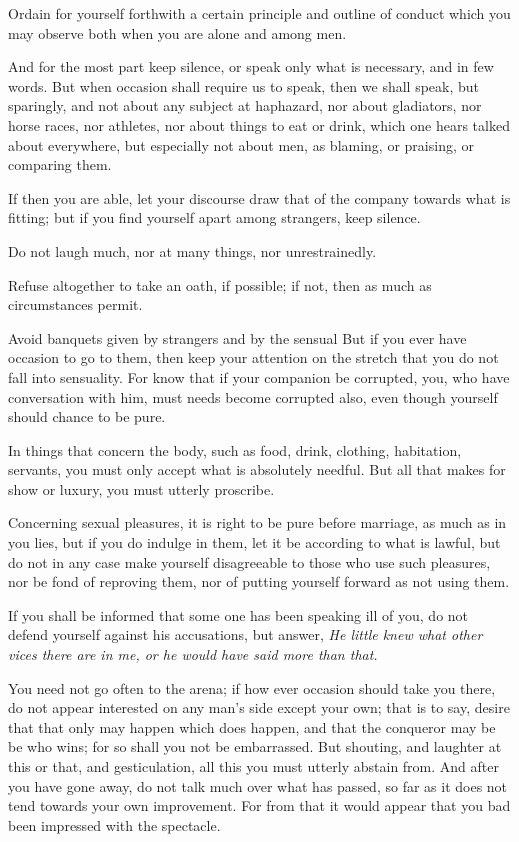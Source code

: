 Ordain for yourself forthwith a certain  principle and outline of conduct which
you may observe both when you are alone and among men.

And for the most part keep silence, or speak only what is necessary, and in few
words. But when  occasion shall require us  to speak, then we  shall speak, but
sparingly, and  not about any subject  at haphazard, nor about  gladiators, nor
horse races, nor  athletes, nor about things  to eat or drink,  which one hears
talked about everywhere, but especially not about men, as blaming, or praising,
or comparing them.

If then you are able, let your  discourse draw that of the company towards what
is fitting; but if you find yourself apart among strangers, keep silence.

Do not laugh much, nor at many things, nor unrestrainedly.

Refuse  altogether to  take an  oath,  if possible;  if  not, then  as much  as
circumstances permit.

Avoid banquets  given by  strangers and  by the  sensual But  if you  ever have
occasion to go to them, then keep your attention on the stretch that you do not
fall into  sensuality. For know that  if your companion be  corrupted, you, who
have  conversation with  him, must  needs  become corrupted  also, even  though
yourself should chance to be pure.

In things  that concern the  body, such  as food, drink,  clothing, habitation,
servants, you must  only accept what is absolutely needful.  But all that makes
for show or luxury, you must utterly proscribe.

Concerning sexual pleasures, it is right to be pure before marriage, as much as
in you  lies, but if  you do indulge  in them, let it  be according to  what is
lawful, but do not in any case make yourself disagreeable to those who use such
pleasures, nor  be fond of reproving  them, nor of putting  yourself forward as
not using them.

If you  shall be informed that  some one has been  speaking ill of you,  do not
defend yourself against his accusations,  but answer, \emph{He little knew what
other vices there are in me, or he would have said more than that.}

You need not go often to the arena; if how ever occasion should take you there,
do not  appear interested on any  man's side except  your own; that is  to say,
desire that that only may happen which  does happen, and that the conqueror may
be be who wins; for so shall you not be embarrassed. But shouting, and laughter
at this or that, and gesticulation, all this you must utterly abstain from. And
after you have gone  away, do not talk much over what has  passed, so far as it
does not tend towards your own improvement.  For from that it would appear that
you bad been impressed with the spectacle.

